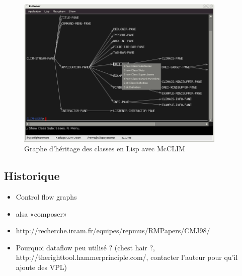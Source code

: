\documentclass{article}
\begin{document}
\begin{figure}[H]
  \centering
  \includegraphics[width=10cm]{lisp-class-graph}
  \caption{Graphe d'héritage des classes en Lisp avec McCLIM}
\label{fig:lisp-class-graph}
\end{figure}
\subsection{Historique}
\begin{itemize}
\item Control flow graphs
\item alsa «composer»
\item http://recherche.ircam.fr/equipes/repmus/RMPapers/CMJ98/
\item Pourquoi dataflow peu utilisé ? (chest hair ?, http://therighttool.hammerprinciple.com/, contacter l'auteur pour qu'il ajoute des VPL)
\end{itemize}

\nocite{*}


\end{document}
